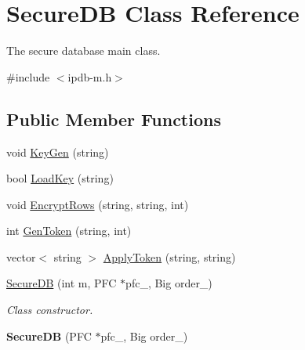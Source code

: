 \hypertarget{classSecureDB}{}\section{Secure\+DB Class Reference}
\label{classSecureDB}


The secure database main class.  




{\ttfamily \#include $<$ipdb-\/m.\+h$>$}

\subsection*{Public Member Functions}
\begin{DoxyCompactItemize}
\item 
void \hyperlink{classSecureDB_aa91f7d309988d84c6922d7e52162517c}{Key\+Gen} (string)
\item 
bool \hyperlink{classSecureDB_ac4626ebf45db1aeccd1a4698f22d92b5}{Load\+Key} (string)
\item 
void \hyperlink{classSecureDB_ae3c57379e37ba84f2f1bf8a29fba5bf2}{Encrypt\+Rows} (string, string, int)
\item 
int \hyperlink{classSecureDB_ac48eb9810677fd34c5c59b7537bcd970}{Gen\+Token} (string, int)
\item 
vector$<$ string $>$ \hyperlink{classSecureDB_a267eb02115e80bffd751bfe3e2fc566f}{Apply\+Token} (string, string)
\item 
\hyperlink{classSecureDB_ab4c368e84ac078f9f598a8cd1da25ed7}{Secure\+DB} (int m, P\+FC $\ast$pfc\+\_\+, Big order\+\_\+)
\begin{DoxyCompactList}\small\item\em Class constructor. \end{DoxyCompactList}\item 
{\bfseries Secure\+DB} (P\+FC $\ast$pfc\+\_\+, Big order\+\_\+)\hypertarget{classSecureDB_a5ae766ecb788b9923d85f45ea96f922f}{}\label{classSecureDB_a5ae766ecb788b9923d85f45ea96f922f}

\end{DoxyCompactItemize}
